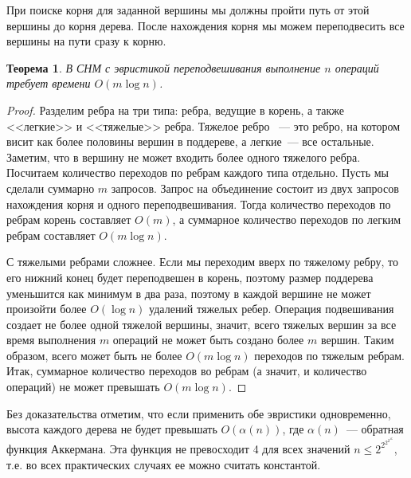 \documentclass[12pt]{article}
\newtheorem*{theorem*}{Теорема}
\renewcommand{\leq}{\leqslant}
\begin{document}
При поиске корня для заданной вершины мы должны пройти путь от этой вершины до корня дерева. После нахождения корня мы можем переподвесить все вершины на пути сразу к корню.

\begin{theorem*}

В СНМ с эвристикой переподвешивания выполнение $n$ операций требует времени $O(m \log n)$.

\end{theorem*}

\begin{proof}

Разделим ребра на три типа: ребра, ведущие в корень, а также <<легкие>> и <<тяжелые>> ребра. Тяжелое ребро ~--- это ребро, на котором висит как более половины вершин в поддереве, а легкие~--- все остальные. Заметим, что в вершину не может входить более одного тяжелого ребра. Посчитаем количество переходов по ребрам каждого типа отдельно. Пусть мы сделали суммарно $m$ запросов. Запрос на объединение состоит из двух запросов нахождения корня и одного переподвешивания. Тогда количество переходов по ребрам корень составляет $O(m)$, а суммарное количество переходов по легким ребрам составляет $O(m \log n)$.

С тяжелыми ребрами сложнее. Если мы переходим вверх по тяжелому ребру, то его нижний конец будет переподвешен в корень, поэтому размер поддерева уменьшится как минимум в два раза, поэтому в каждой вершине не может произойти более $O(\log n)$ удалений тяжелых ребер. Операция подвешивания создает не более одной тяжелой вершины, значит, всего тяжелых вершин за все время выполнения $m$ операций не может быть создано более $m$ вершин. Таким образом, всего может быть не более $O(m \log n)$ переходов по тяжелым ребрам. Итак, суммарное количество переходов во ребрам (а значит, и количество операций) не может превышать $O(m \log n)$.

\end{proof}

Без доказательства отметим, что если применить обе эвристики одновременно, высота каждого дерева не будет превышать $O(\alpha(n))$, где $\alpha(n)$~--- обратная функция Аккермана. Эта функция не превосходит 4 для всех значений $n \leq 2^{2^{2^{2^{16}}}}$, т.е. во всех практических случаях ее можно считать константой.
\end{document}

